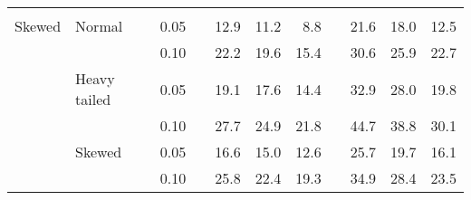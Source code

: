 \begin{table}[ht]
\begin{scriptsize}
\begin{center}
\begin{tabular}{ll p{.1cm} c p{.1cm} rrr p{.1cm} rrr}
&&&&&&&&&&&\\
Skewed       & Normal       && 0.05 &&   12.9 & 11.2 & 8.8 &   & 21.6 & 18.0 & 12.5 \\ 
             &              && 0.10 &&   22.2 & 19.6 & 15.4 &   & 30.6 & 25.9 & 22.7 \\ 
             & Heavy tailed && 0.05 &&   19.1 & 17.6 & 14.4 &   & 32.9 & 28.0 & 19.8 \\ 
             &              && 0.10 &&   27.7 & 24.9 & 21.8 &   & 44.7 & 38.8 & 30.1 \\ 
             & Skewed       && 0.05 &&   16.6 & 15.0 & 12.6 &   & 25.7 & 19.7 & 16.1 \\ 
             &              && 0.10 &&   25.8 & 22.4 & 19.3 &   & 34.9 & 28.4 & 23.5 \\ 


\end{tabular}
\end{center}
\end{scriptsize}
\end{table}
